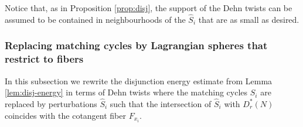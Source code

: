 \begin{rem}\label{rem:small_Dehn}
Notice that, as in Proposition \ref{prop:disj}, the support of the Dehn twists can be assumed to be contained in neighbourhoods of the $\hat{S}_{i}$ that are as small as desired.

\end{rem}
\subsubsection{Replacing matching cycles by Lagrangian spheres that restrict to fibers}\label{subsec:exact-seq} In this subsection we rewrite the disjunction energy estimate from Lemma \ref{lem:disj-energy} in terms of Dehn twists where the matching cycles $S_{i}$ are replaced by perturbations  $\hat{S}_{i}$ such that the intersection of $\hat{S}_{i}$ with $D^{\ast}_{r}(N)$ coincides with the cotangent fiber $F_{x_{i}}$.


